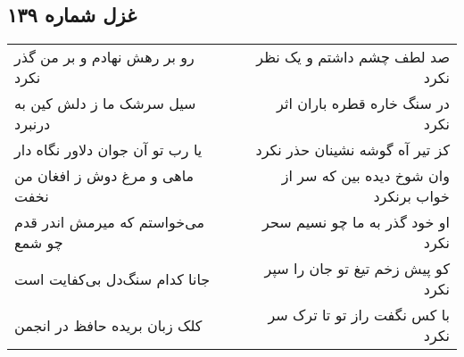 \begin{center}
\section*{غزل شماره ۱۳۹}
\label{sec:sh139}
\begin{longtable}{l p{0.5cm} r}
رو بر رهش نهادم و بر من گذر نکرد
&&
صد لطف چشم داشتم و یک نظر نکرد
\\
سیل سرشک ما ز دلش کین به درنبرد
&&
در سنگ خاره قطره باران اثر نکرد
\\
یا رب تو آن جوان دلاور نگاه دار
&&
کز تیر آه گوشه نشینان حذر نکرد
\\
ماهی و مرغ دوش ز افغان من نخفت
&&
وان شوخ دیده بین که سر از خواب برنکرد
\\
می‌خواستم که میرمش اندر قدم چو شمع
&&
او خود گذر به ما چو نسیم سحر نکرد
\\
جانا کدام سنگ‌دل بی‌کفایت است
&&
کو پیش زخم تیغ تو جان را سپر نکرد
\\
کلک زبان بریده حافظ در انجمن
&&
با کس نگفت راز تو تا ترک سر نکرد
\\
\end{longtable}
\end{center}

